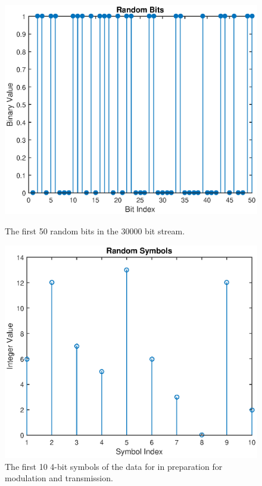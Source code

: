 \documentclass{article}
\begin{document}
\begin{figure}[H]
	\hspace{-1.5cm}
	\begin{minipage}{7cm}
		\centering
		\includegraphics[scale=0.5]{figA}
		\caption{The first 50 random bits in the 30000 bit stream.}
	\end{minipage}
	\hspace{1cm}
	\begin{minipage}{7cm}
		\centering
		\includegraphics[scale=0.5]{figB}
		\caption{The first 10 4-bit symbols of the data for in preparation for modulation and transmission.}
	\end{minipage}
\end{figure}
\end{document}
